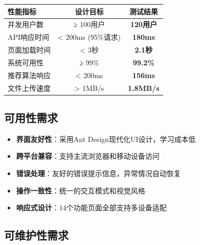 \documentclass[12pt,a4paper]{article}
\begin{document}
\begin{table}[H]
\centering
\begin{tcolorbox}[
    colback=light,
    colframe=success,
    title={\textbf{系统性能指标要求}},
    coltitle=white,
    colbacktitle=success,
    fonttitle=\bfseries,
    rounded corners=5pt,
    width=0.95\textwidth
]
\begin{tabular}{lcc}
\toprule
\rowcolor{success!20}
\textbf{性能指标} & \textbf{设计目标} & \textbf{测试结果} \\
\midrule
并发用户数 & ≥ 100用户 & \textcolor{success}{\textbf{120用户}} \\
\rowcolor{light}
API响应时间 & < 200ms (95\%请求) & \textcolor{success}{\textbf{180ms}} \\
页面加载时间 & < 3秒 & \textcolor{success}{\textbf{2.1秒}} \\
\rowcolor{light}
系统可用性 & ≥ 99\% & \textcolor{success}{\textbf{99.2\%}} \\
推荐算法响应 & < 200ms & \textcolor{success}{\textbf{156ms}} \\
\rowcolor{light}
文件上传速度 & > 1MB/s & \textcolor{success}{\textbf{1.8MB/s}} \\
\bottomrule
\end{tabular}
\end{tcolorbox}
\end{table}

\subsection{可用性需求}

\begin{successbox}[title={用户体验要求}]
\begin{itemize}[nosep]
    \item \textbf{界面友好性}：采用Ant Design现代化UI设计，学习成本低
    \item \textbf{跨平台兼容}：支持主流浏览器和移动设备访问
    \item \textbf{错误处理}：友好的错误提示信息，异常情况自动恢复
    \item \textbf{操作一致性}：统一的交互模式和视觉风格
    \item \textbf{响应式设计}：14个功能页面全部支持多设备适配
\end{itemize}
\end{successbox}

\subsection{可维护性需求}
\end{document}
